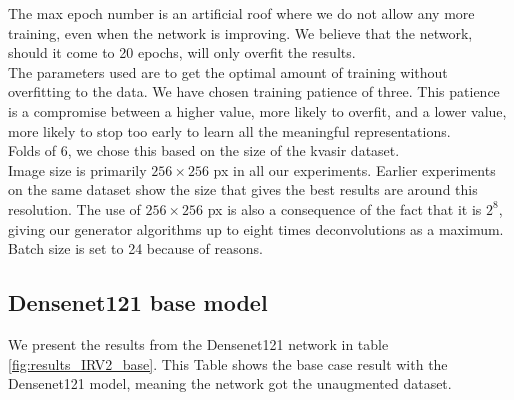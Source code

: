 The max epoch number is an artificial roof where we do not allow any more training, even when the network is improving.  We believe that the network, should it come to 20 epochs, will only overfit the results.\\
\vspace{5px}
The parameters used are to get the optimal amount of training without overfitting to the data. We have chosen training patience of three. This patience is a compromise between a higher value, more likely to overfit, and a lower value, more likely to stop too early to learn all the meaningful representations. \\
\vspace{5px}
Folds of 6, we chose this based on the size of the kvasir dataset. \\ 
\vspace{5px}
Image size is primarily $256 \times 256$ px in all our experiments. Earlier experiments on the same dataset show the size that gives the best results are around this resolution. The use of $256 \times 256$ px is also a consequence of the fact that it is $2^8$, giving our generator algorithms up to eight times deconvolutions as a maximum.\\
\vspace{5px}
Batch size is set to 24 because of reasons. \\ 


\subsection{Densenet121 base model}
We present the results from  the Densenet121 network in table \ref{fig:results_IRV2_base}.
This Table shows the base case result with the Densenet121 model, meaning the network got the unaugmented dataset. 

